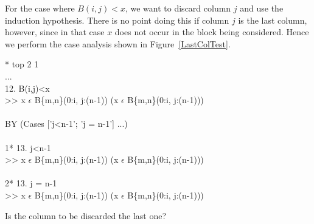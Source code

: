 For the case where $B(i,j)<x$, we want to discard column
$j$ and use the induction hypothesis.  There is no point doing this if
column $j$ is the last column, however, since in that case $x$ does not
occur in the block being considered.  Hence we perform the case analysis shown
in Figure~\ref{LastColTest}.
\begin{RuledFigure}
\begin{Screen}{1}{\SnapshotSize}
\N{}* top 2 1 \\{}
\N{}... \\{}
\N{}12. B(i,j)<x \\{}
\N{}>> x \(\epsilon{}\) B\{m,n\}(0:i, j:(n-1))  \mvee{}  \mneg{}(x \(\epsilon{}\) B\{m,n\}(0:i, j:(n-1))) \\{}
\N{} \\{}
\N{}BY (Cases ['j<n-1'; 'j = n-1'] ...) \\{}
\N{}    \\{}
\N{}1* 13. j<n-1 \\{}
\N{}   >> x \(\epsilon{}\) B\{m,n\}(0:i, j:(n-1))  \mvee{}  \mneg{}(x \(\epsilon{}\) B\{m,n\}(0:i, j:(n-1))) \\{}
\N{} \\{}
\N{}2* 13. j = n-1 \\{}
\N{}   >> x \(\epsilon{}\) B\{m,n\}(0:i, j:(n-1))  \mvee{}  \mneg{}(x \(\epsilon{}\) B\{m,n\}(0:i, j:(n-1)))    
\end{Screen}%
\caption{Is the column to be discarded the last one?}
\label{LastColTest} 
\end{RuledFigure}

